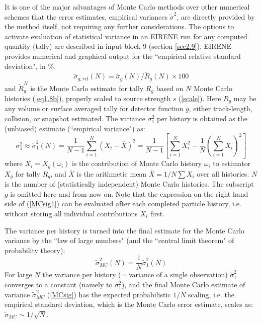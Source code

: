 It is one of the major advantages of Monte Carlo methods over other numerical
schemes that the error estimates, empirical variances $\tilde\sigma^2$, are directly provided by the method itself,
not requiring any further considerations.
The options to activate evaluation of statistical variance in an EIRENE run for any computed quantity
(tally) are described in input block 9 (section \ref{sec2.9}). EIRENE provides numerical and graphical
output for the ``empirical relative standard deviation", in \%.
\begin{equation}
\tilde\sigma_{g,rel}(N) = \tilde\sigma_g(N)/\tilde R_g(N) \times 100
\end{equation}
and $\tilde R_g^N$ is the Monte Carlo estimate for tally $R_g$  based on $N$
Monte Carlo histories (\ref{eq1.8b}), properly scaled to source strength $s$ (\ref{scale}). Here $R_g$ may be any volume or surface averaged tally
for detector function $g$, either track-length, collision, or snapshot estimated.
The  variance $\sigma^2_1$ per history is obtained as the (unbiased) estimate (``empirical variance") as:
\begin{equation}\label{MCsig1}
\sigma^2_1 \approx \tilde\sigma^2_1(N) = \frac{1}{N-1}\sum_{i=1}^N (X_i-\overline{X})^2=\frac 1{N-1}\left[\sum_{i=1}^N X_i^2 - \frac 1N \left(\sum_{i=1}^N X_i\right)^2\right]
\end{equation}
where $X_i= X_g(\omega_i)$ is the contribution of Monte Carlo history $\omega_i$ to
estimator $X_g$ for tally $R_g$, and
$\overline{X}$ is the arithmetic mean $\overline{X}=1/N\sum X_i$ over all histories. $N$ is the number of (statistically independent)
Monte Carlo histories. The subscript $g$ is omitted here and from now on. Note that the expression on the right hand side of (\ref{MCsig1}) can be evaluated after each completed particle history,
i.e. without storing all individual contributions $X_i$ first.

The variance per history is turned into the final estimate for the Monte Carlo variance by the ``law of large numbers" (and the ``central limit theorem"
of probability theory):
\begin{equation}\label{MCsig}
\tilde\sigma^2_{MC}(N)=\frac 1N \tilde \sigma_1^2(N)
\end{equation}
For large $N$ the variance per history (= variance of a single observation) $\tilde\sigma_1^2$ converges to a  constant (namely to $\sigma^2_1$),
and the final Monte Carlo estimate of variance $\tilde \sigma^2_{MC}$ (\ref{MCsig})
has the expected probabilistic $1/N$ scaling,
i.e. the empirical standard deviation, which is the Monte Carlo error estimate,  scales as: $\tilde\sigma_{MC} \sim 1/\sqrt{N}$.
